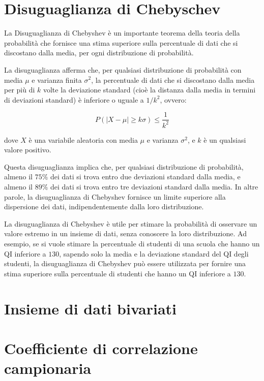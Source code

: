 \section{Disuguaglianza di Chebyschev}
La Disuguaglianza di Chebyshev è un importante teorema della teoria della probabilità che fornisce una stima superiore sulla percentuale di dati che si discostano dalla media, per ogni distribuzione di probabilità.

La disuguaglianza afferma che, per qualsiasi distribuzione di probabilità con media $\mu$ e varianza finita $\sigma^2$, la percentuale di dati che si discostano dalla media per più di $k$ volte la deviazione standard (cioè la distanza dalla media in termini di deviazioni standard) è inferiore o uguale a $1/k^2$, ovvero:

$$P(|X-\mu| \geq k\sigma) \leq \frac{1}{k^2}$$

dove $X$ è una variabile aleatoria con media $\mu$ e varianza $\sigma^2$, e $k$ è un qualsiasi valore positivo.

Questa disuguaglianza implica che, per qualsiasi distribuzione di probabilità, almeno il $75\%$ dei dati si trova entro due deviazioni standard dalla media, e almeno il $89\%$ dei dati si trova entro tre deviazioni standard dalla media. In altre parole, la disuguaglianza di Chebyshev fornisce un limite superiore alla dispersione dei dati, indipendentemente dalla loro distribuzione.

La disuguaglianza di Chebyshev è utile per stimare la probabilità di osservare un valore estremo in un insieme di dati, senza conoscere la loro distribuzione. Ad esempio, se si vuole stimare la percentuale di studenti di una scuola che hanno un QI inferiore a $130$, sapendo solo la media e la deviazione standard del QI degli studenti, la disuguaglianza di Chebyshev può essere utilizzata per fornire una stima superiore sulla percentuale di studenti che hanno un QI inferiore a $130$.

\section{Insieme di dati bivariati}
\section{Coefficiente di correlazione campionaria}


